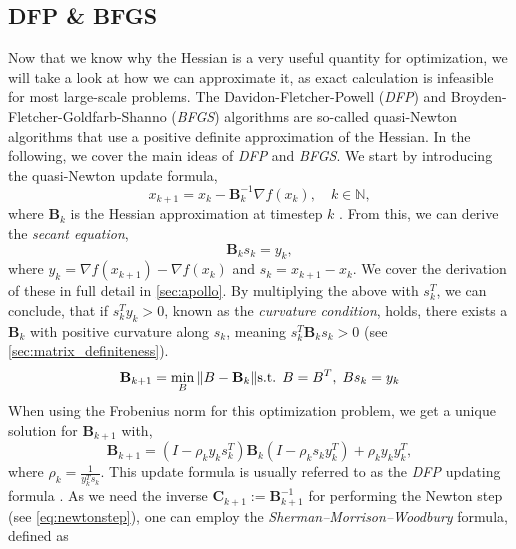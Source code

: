\subsection{DFP \& BFGS}
\label{sec:bfgs}
Now that we know why the Hessian is a very useful quantity for optimization, we will take a look at how we can approximate it,
as exact calculation is infeasible for most large-scale problems.
The Davidon-Fletcher-Powell (\emph{DFP}\cite{Goodfellow-et-al-2016})  and Broyden-Fletcher-Goldfarb-Shanno (\emph{BFGS}\cite{BFGS})
algorithms are so-called quasi-Newton algorithms 
that use a positive definite approximation of the Hessian. In the following,
we cover the main ideas of \emph{DFP} and \emph{BFGS}. We start by introducing the quasi-Newton update formula,
\begin{equation}
x_{k+1} = x_k - \mathbf{B}_k^{-1} \nabla f(x_k), \quad k \in \mathbb{N},
\end{equation}
where $\mathbf{B}_k$ is the Hessian approximation at timestep $k$ \cite{nocedal2006numerical}.
From this, we can derive the \emph{secant equation},
\begin{equation}
\mathbf{B}_k s_k = y_k,
\end{equation}
where $y_k = \nabla f(x_{k+1}) - \nabla f(x_k)$ and $s_k = x_{k+1} - x_k$.
We cover the derivation of these in full detail in \ref{sec:apollo}.
By multiplying the above with $s_k^T$, we can conclude, that if $s_k^T y_k > 0$,
known as the \emph{curvature condition}, holds, there exists a $\mathbf{B}_k$ with positive curvature along $s_k$,
meaning $s_k^T\mathbf{B}_k s_k > 0$ (see \ref{sec:matrix_definiteness}).
\begin{equation}
    \mathbf{B}_{k+1} = \min_{B} \|B - \mathbf{B}_k\| \\
    \text{s.t. }   B = B^T, \; Bs_k = y_k 
   \end{equation}
When using the Frobenius norm for this optimization problem, we get a unique solution for $\mathbf{B}_{k+1}$ with,
\begin{equation} \label{eq:DFP}
\mathbf{B}_{k+1} = \left(I - \rho_k y_k s_k^T\right) \mathbf{B}_k \left(I - \rho_k s_k y_k^T\right) + \rho_k y_k y_k^T,
\end{equation}
where $\rho_k = \frac{1}{y_k^T s_k}$. This update formula is usually referred to as the \emph{DFP} updating formula \cite{DFP}.
As we need the inverse $\mathbf{C}_{k+1} := \mathbf{B}_{k+1}^{-1}$ for performing the Newton step (see \ref{eq:newtonstep}), one can employ the \emph{Sherman--Morrison--Woodbury} formula, defined as
